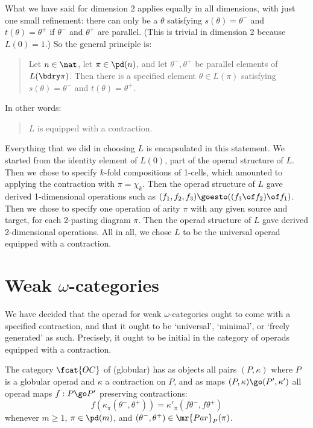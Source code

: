 What we have said for dimension 2 applies equally in all dimensions, with
just one small refinement: there can only be a $\theta$ satisfying
$s(\theta) = \theta^-$ and $t(\theta) = \theta^+$ if $\theta^-$ and
$\theta^+$ are parallel.  (This is trivial in dimension 2 because $L(0) =
1$.)  So the general principle is:
%
\begin{quote}
  Let $n\in\nat$, let $\pi \in \pd(n)$, and let $\theta^-, \theta^+$ be
  parallel elements of $L(\bdry\pi)$.  Then there is a specified element
  $\theta\in L(\pi)$ satisfying $s(\theta) = \theta^-$ and $t(\theta) =
  \theta^+$.
\end{quote}
%
In other words: 
%
\begin{quote}
  $L$ is equipped with a contraction.%
%
%
\end{quote}

Everything that we did in choosing $L$ is encapsulated in this statement.
We started from the identity element of $L(0)$, part of the operad
structure of $L$.  Then we chose to specify $k$-fold compositions of
1-cells, which amounted to applying the contraction with $\pi = \chi_k$.
Then the operad structure of $L$ gave derived 1-dimensional operations such
as $(f_1, f_2, f_3) \goesto ((f_3 \of f_2) \of f_1)$.  Then we chose to
specify one operation of arity $\pi$ with any given source and target, for
each 2-pasting diagram $\pi$.  Then the operad structure of $L$ gave
derived 2-dimensional operations.  All in all, we chose $L$ to be the
universal operad equipped with a contraction.



\section{Weak $\omega$-categories}

We have decided that the operad for weak $\omega$-categories ought to come
with a specified contraction, and that it ought to be `universal',
`minimal', or `freely generated' as such.  Precisely, it ought to be
initial in the category of operads equipped with a contraction.  
%
\begin{defn}	
The category $\fcat{OC}$%
% 
% 
of (globular) %
%
%
has
as objects all pairs $(P,\kappa)$ where $P$ is a globular operad and
$\kappa$ a contraction on $P$, and as maps $(P, \kappa) \go (P', \kappa')$
all operad maps $f: P \go P'$ preserving contractions:
\[
f(\kappa_\pi(\theta^-, \theta^+)) 
=
\kappa'_\pi (f\theta^-, f\theta^+) 
\]
whenever $m\geq 1$, $\pi\in\pd(m)$, and $(\theta^-, \theta^+) \in
\mr{Par}_P(\pi)$.  
\end{defn}

